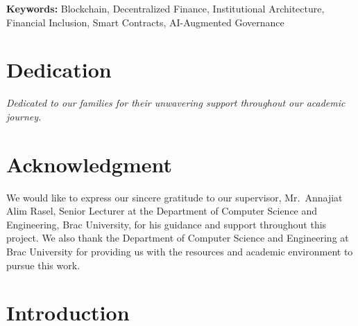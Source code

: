 \documentclass[12pt,a4paper]{report}
\begin{document}
\vspace{0.5em}
\noindent\textbf{Keywords:} Blockchain, Decentralized Finance, Institutional Architecture, Financial Inclusion, Smart Contracts, AI-Augmented Governance

\newpage
\thispagestyle{empty}

\chapter*{Dedication}

\vspace{3cm}
\begin{center}
\textit{Dedicated to our families for their unwavering support throughout our academic journey.}
\end{center}

\newpage
\thispagestyle{empty}

\chapter*{Acknowledgment}

We would like to express our sincere gratitude to our supervisor, Mr.\ Annajiat Alim Rasel, Senior Lecturer at the Department of Computer Science and Engineering, Brac University, for his guidance and support throughout this project. We also thank the Department of Computer Science and Engineering at Brac University for providing us with the resources and academic environment to pursue this work.

\newpage
\setcounter{page}{1}
\tableofcontents
\newpage
\listoftables
\newpage
\listoffigures
\newpage
{}
\setcounter{page}{1}


\chapter{Introduction}
\end{document}
